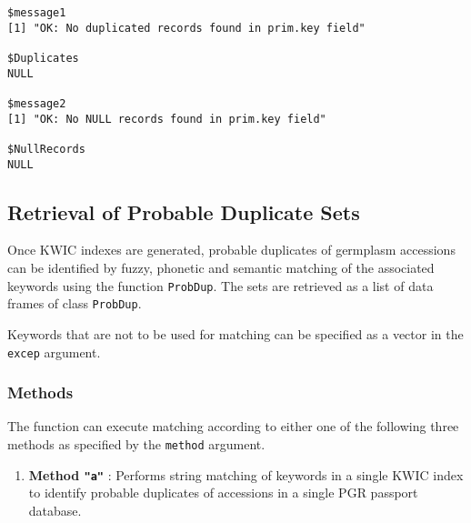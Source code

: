 \documentclass[
]{article}
\providecommand{\tightlist}{%
  \setlength{\itemsep}{0pt}\setlength{\parskip}{0pt}}
\begin{document}
\begin{verbatim}
$message1
[1] "OK: No duplicated records found in prim.key field"

$Duplicates
NULL

$message2
[1] "OK: No NULL records found in prim.key field"

$NullRecords
NULL
\end{verbatim}

\hypertarget{retrieval-of-probable-duplicate-sets}{%
\subsection{Retrieval of Probable Duplicate
Sets}\label{retrieval-of-probable-duplicate-sets}}

Once KWIC indexes are generated, probable duplicates of germplasm
accessions can be identified by fuzzy, phonetic and semantic matching of
the associated keywords using the function \texttt{ProbDup}. The sets
are retrieved as a list of data frames of class \texttt{ProbDup}.

Keywords that are not to be used for matching can be specified as a
vector in the \texttt{excep} argument.

\hypertarget{methods}{%
\subsubsection{Methods}\label{methods}}

The function can execute matching according to either one of the
following three methods as specified by the \texttt{method} argument.

\begin{enumerate}
\def\labelenumi{\arabic{enumi}.}
\tightlist
\item
  \textbf{Method \texttt{"a"}} : Performs string matching of keywords in
  a single KWIC index to identify probable duplicates of accessions in a
  single PGR passport database.
\end{enumerate}
\end{document}
